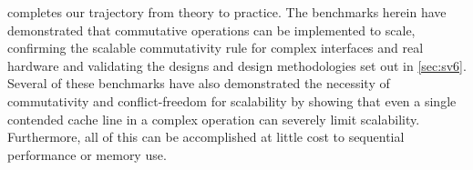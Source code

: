  completes our trajectory from theory to practice.
%
The benchmarks herein have demonstrated that commutative operations
can be implemented to scale, confirming the scalable commutativity
rule for complex interfaces and real hardware and validating the
designs and design methodologies set out in \cref{sec:sv6}.
%
Several of these benchmarks have also demonstrated the necessity of
commutativity and conflict-freedom for scalability by showing that
even a single contended cache line in a complex operation can severely
limit scalability.
%
Furthermore, all of this can be accomplished at little cost to
sequential performance or memory use.

